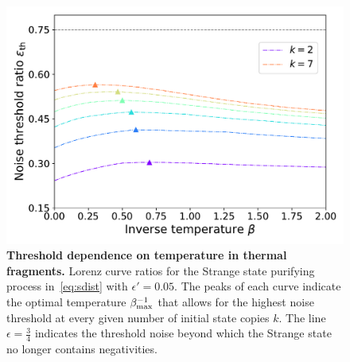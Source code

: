 \documentclass[pra,
aps,
twocolumn,
superscriptaddress,
groupedaddress,
nofootinbib,
reprint
]{revtex4-1}
\begin{document}
\begin{figure}[h]
    \centering
    \includegraphics[scale=0.5]{figs/thermal_distill.pdf}
    \caption{\textbf{Threshold dependence on temperature in thermal fragments.} Lorenz curve ratios for the Strange state purifying process in~\cref{eq:sdist} with $\epsilon' = 0.05$.
    The peaks of each curve indicate the optimal temperature $\beta_{\rm{max}}^{-1}$ that allows for the highest noise threshold at every given number of initial state copies $k$.
    The line $\epsilon = \frac{3}{4}$ indicates the threshold noise beyond which the Strange state no longer contains negativities.
    }
    \label{fig:thermal_distill}
\end{figure}
\end{document}
